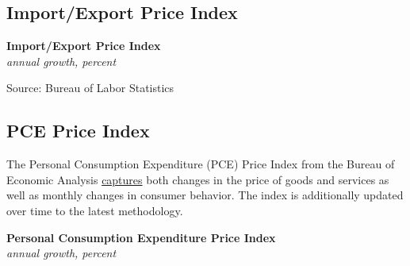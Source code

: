\documentclass{report}
\makeatletter
\newcommand{\tbllink}[1]{\href{https://raw.githubusercontent.com/bdecon/US-chartbook/master/chartbook/data/#1}{\faTable}}
\newcommand*\short[1]{\expandafter\@gobbletwo\number\numexpr#1\relax}
\newcommand{\dateaxisticks}{
		date coordinates in=x, axis line style={draw=none},
		xmax={2022-01-30},
		max space between ticks=40,	    
		xtick={{1990-01-01}, {1992-01-01}, {1994-01-01}, 
			{1996-01-01}, {1998-01-01}, {2000-01-01}, 
			{2002-01-01}, {2004-01-01}, {2006-01-01},
			{2008-01-01}, {2010-01-01}, {2012-01-01}, {2014-01-01},
		    {2016-01-01}, {2018-01-01}, {2020-01-01}, {2022-01-01}},
		minor xtick={{1989-01-01}, {1991-01-01}, {1993-01-01},
			{1995-01-01}, {1997-01-01}, {1999-01-01}, 
			{2001-01-01}, {2003-01-01}, {2005-01-01}, {2007-01-01},
		    {2009-01-01}, {2011-01-01}, {2013-01-01}, {2015-01-01},
		    {2017-01-01}, {2019-01-01}, {2021-01-01}},
		enlarge y limits={0.06}, enlarge x limits={0.01},
		}
\newcommand{\bbar}[2]{extra #1 ticks = {{#2}}, extra #1 tick labels = ,
		extra #1 tick style = {grid=major, grid style={thick, black!25}},}
\newcommand{\stdline}[4]{\addplot[very thick, no markers, color=#1] 
		table [x=#2, y=#3, col sep=comma] {#4};	}
\newcommand{\rbars}{
		\fill[color=black!10] (axis cs:{1990-07-01},\pgfkeysvalueof{/pgfplots/ymin}) rectangle 
			(axis cs:{1991-03-01}, \pgfkeysvalueof{/pgfplots/ymax});
		\fill[color=black!10] (axis cs:{2007-12-01},\pgfkeysvalueof{/pgfplots/ymin}) rectangle 
			(axis cs:{2009-07-01}, \pgfkeysvalueof{/pgfplots/ymax});
		\fill[color=black!10] (axis cs:{2001-03-01},\pgfkeysvalueof{/pgfplots/ymin}) rectangle 
			(axis cs:{2001-11-01}, \pgfkeysvalueof{/pgfplots/ymax});
		\fill[color=black!10] (axis cs:{2020-02-01},\pgfkeysvalueof{/pgfplots/ymin}) rectangle 
			(axis cs:{2020-05-01}, \pgfkeysvalueof{/pgfplots/ymax});}
\makeatother
\begin{document}
{{\newpage
\subsection*{\color{black!70} \seriffont Import/Export Price Index}
\begin{minipage}{0.76\textwidth}
\small 
\vspace{1mm}

\normalsize \textbf{Import/Export Price Index}\\
\footnotesize{\textit{annual growth, percent}}\\
\vspace{22mm}

\hspace{4mm} 
\vspace{1mm}

\footnotesize{Source: Bureau of Labor Statistics} \hfill \tbllink{mxpi.csv}
\vspace{8mm}

\subsection*{\color{black!70} \seriffont PCE Price Index}
\small The Personal Consumption Expenditure (PCE) Price Index from the Bureau of Economic Analysis \href{https://www.bea.gov/data/personal-consumption-expenditures-price-index}{captures} both changes in the price of goods and services as well as monthly changes in consumer behavior. The index is additionally updated over time to the latest methodology. 


\vspace{1mm}

\normalsize \textbf{Personal Consumption Expenditure Price Index}\\
\footnotesize{\textit{annual growth, percent}}\\
\vspace{26mm}


\end{minipage}}}
\end{document}
